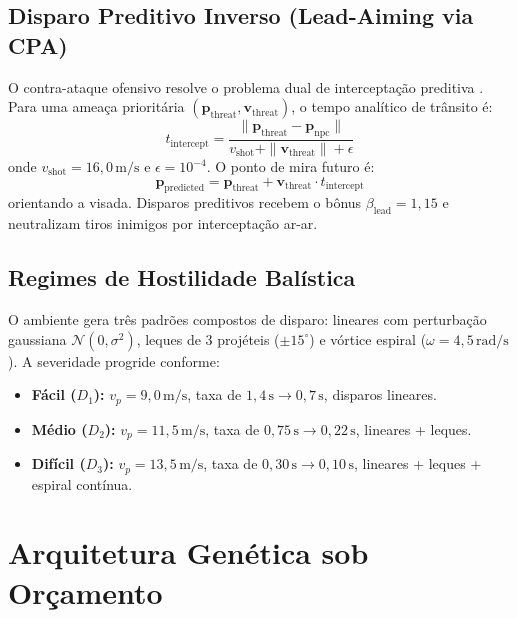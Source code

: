 \documentclass[10pt,conference,twocolumn]{article}
\begin{document}
\subsection{Disparo Preditivo Inverso (Lead-Aiming via CPA)}
O contra-ataque ofensivo resolve o problema dual de interceptação preditiva \cite{wang2014self}. Para uma ameaça prioritária $(\mathbf{p}_{\text{threat}}, \mathbf{v}_{\text{threat}})$, o tempo analítico de trânsito é:
\begin{equation}
t_{\text{intercept}} = \frac{\|\mathbf{p}_{\text{threat}} - \mathbf{p}_{\text{npc}}\|}{v_{\text{shot}} + \|\mathbf{v}_{\text{threat}}\| + \epsilon} \label{eq:t_intercept}
\end{equation}
onde $v_{\text{shot}} = 16{,}0\,\text{m/s}$ e $\epsilon = 10^{-4}$. O ponto de mira futuro é:
\begin{equation}
\mathbf{p}_{\text{predicted}} = \mathbf{p}_{\text{threat}} + \mathbf{v}_{\text{threat}} \cdot t_{\text{intercept}} \label{eq:p_predicted}
\end{equation}
orientando a visada. Disparos preditivos recebem o bônus $\beta_{\text{lead}} = 1{,}15$ e neutralizam tiros inimigos por interceptação ar-ar.

\subsection{Regimes de Hostilidade Balística}
O ambiente gera três padrões compostos de disparo: lineares com perturbação gaussiana $\mathcal{N}(0, \sigma^2)$, leques de 3 projéteis ($\pm 15^\circ$) e vórtice espiral ($\omega = 4{,}5\,\text{rad/s}$). A severidade progride conforme:
\begin{itemize}
    \item \textbf{Fácil ($D_1$):} $v_p = 9{,}0\,\text{m/s}$, taxa de $1{,}4\,\text{s} \to 0{,}7\,\text{s}$, disparos lineares.
    \item \textbf{Médio ($D_2$):} $v_p = 11{,}5\,\text{m/s}$, taxa de $0{,}75\,\text{s} \to 0{,}22\,\text{s}$, lineares + leques.
    \item \textbf{Difícil ($D_3$):} $v_p = 13{,}5\,\text{m/s}$, taxa de $0{,}30\,\text{s} \to 0{,}10\,\text{s}$, lineares + leques + espiral contínua.
\end{itemize}

\section{Arquitetura Genética sob Orçamento}
\label{sec:ag}
\end{document}
